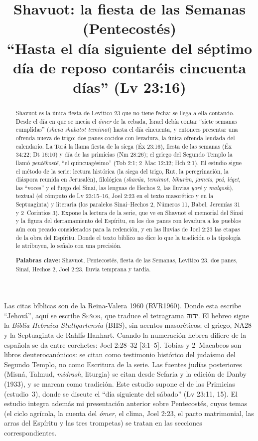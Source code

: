 \documentclass[11pt,letterpaper]{article}
\title{\color{tierraroja}\bfseries Shavuot: la fiesta de las Semanas (Pentecostés)\\[4pt]\large\color{sepia}\mdseries ``Hasta el día siguiente del séptimo día de reposo contaréis cincuenta días'' (Lv 23:16)}
\author{}\date{}
\newcommand{\heb}[1]{\mbox{\foreignlanguage{hebrew}{#1}}}
\newcommand{\SENOR}{\textsc{Señor}}
\begin{document}
\maketitle\thispagestyle{empty}

\begin{abstract}\noindent
Shavuot es la única fiesta de Levítico 23 que no tiene fecha: se llega a ella contando. Desde el día en que se mecía el \emph{ómer} de la cebada, Israel debía contar ``siete semanas cumplidas'' (\emph{sheva shabatot temimot}) hasta el día cincuenta, y entonces presentar una ofrenda nueva de trigo: dos panes cocidos con levadura, la única ofrenda leudada del calendario. La Torá la llama fiesta de la siega (Éx 23:16), fiesta de las semanas (Éx 34:22; Dt 16:10) y día de las primicias (Nm 28:26); el griego del Segundo Templo la llamó \emph{pentēkostē}, ``el quincuagésimo'' (Tob 2:1; 2~Mac 12:32; Hch 2:1). El estudio sigue el método de la serie: lectura histórica (la siega del trigo, Rut, la peregrinación, la diáspora reunida en Jerusalén), filológica (\emph{shavúa}, \emph{temimot}, \emph{bikurim}, \emph{jamets}, \emph{peá}, \emph{léqet}, las ``voces'' y el fuego del Sinaí, las lenguas de Hechos 2, las lluvias \emph{yoré} y \emph{malqosh}), textual (el cómputo de Lv 23:15--16, Joel 2:23 en el texto masorético y en la Septuaginta) y literaria (los paralelos Sinaí--Hechos 2, Números 11, Babel, Jeremías 31 y 2~Corintios 3). Expone la lectura de la serie, que ve en Shavuot el memorial del Sinaí y la figura del derramamiento del Espíritu, en los dos panes con levadura a los pueblos aún con pecado considerados para la redención, y en las lluvias de Joel 2:23 las etapas de la obra del Espíritu. Donde el texto bíblico no dice lo que la tradición o la tipología le atribuyen, lo señalo con una precisión.
\par\smallskip\noindent\textbf{Palabras clave:} Shavuot, Pentecostés, fiesta de las Semanas, Levítico 23, dos panes, Sinaí, Hechos 2, Joel 2:23, lluvia temprana y tardía.\end{abstract}

\begin{nota}
Las citas bíblicas son de la Reina-Valera 1960 (RVR1960). Donde esta escribe ``Jehová'', aquí se escribe \SENOR, que traduce el tetragrama \heb{יהוה}. El hebreo sigue la \emph{Biblia Hebraica Stuttgartensia} (BHS), sin acentos masoréticos; el griego, NA28 y la Septuaginta de Rahlfs-Hanhart. Cuando la numeración hebrea difiere de la española se da entre corchetes: Joel 2:28--32 [3:1--5]. Tobías y 2~Macabeos son libros deuterocanónicos: se citan como testimonio histórico del judaísmo del Segundo Templo, no como Escritura de la serie. Las fuentes judías posteriores (Misná, Talmud, \emph{midrash}, liturgia) se citan desde Sefaria y la edición de Danby (1933), y se marcan como tradición. Este estudio supone el de las Primicias (estudio~3), donde se discute el ``día siguiente del sábado'' (Lv 23:11, 15). El estudio integra además mi presentación anterior sobre Pentecostés, cuyos temas (el ciclo agrícola, la cuenta del \emph{ómer}, el clima, Joel 2:23, el pacto matrimonial, las arras del Espíritu y las tres trompetas) se tratan en las secciones correspondientes.
\end{nota}
\end{document}
